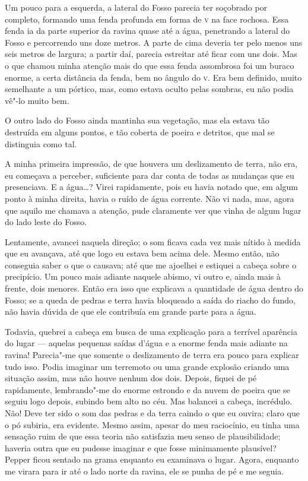 Um pouco para a esquerda, a lateral do Fosso parecia ter soçobrado por completo, formando uma fenda profunda em forma
de \textsc{v} na face rochosa. Essa fenda ia da parte superior da ravina quase até a água, penetrando a lateral do Fosso e
percorrendo uns doze metros. A parte de cima deveria ter pelo menos uns seis metros de largura; a partir daí, parecia
estreitar até ficar com uns dois. Mas o que chamou minha atenção mais do que essa fenda assombrosa foi um
buraco enorme, a certa distância da fenda, bem no ângulo do \textsc{v}. Era bem definido, muito semelhante a um pórtico, mas, como
estava oculto pelas sombras, eu não podia vê"-lo muito bem.

O outro lado do Fosso ainda mantinha sua vegetação, mas ela estava tão destruída em alguns pontos, e tão coberta de
poeira e detritos, que mal se distinguia como tal.

A minha primeira impressão, de que houvera um deslizamento de terra, não era, eu começava a perceber, suficiente para
dar conta de todas as mudanças que eu presenciava. E a água\ldots{}? Virei rapidamente, pois eu havia notado que, em algum
ponto à minha direita, havia o ruído de água corrente. Não vi nada, mas, agora que aquilo me chamava a atenção, pude
claramente ver que vinha de algum lugar do lado leste do Fosso.

Lentamente, avancei naquela direção; o som ficava cada vez mais nítido à medida que eu avançava, até que logo eu estava
bem acima dele. Mesmo então, não conseguia saber o que o causava; até que me ajoelhei e estiquei a cabeça sobre o
precipício. Um pouco mais adiante naquele abismo, vi outro e, ainda mais à frente, dois menores. Então era isso que
explicava a quantidade de água dentro do Fosso; se a queda de pedras e terra havia bloqueado a saída do riacho do
fundo, não havia dúvida de que ele contribuía em grande parte para a água.

Todavia, quebrei a cabeça em busca de uma explicação para a terrível aparência do lugar --- aquelas pequenas saídas
d'água e a enorme fenda mais adiante na ravina! Parecia"-me que somente o deslizamento de terra era pouco para explicar tudo
isso. Podia imaginar um terremoto ou uma grande explosão criando uma situação assim, mas não houve nenhum dos dois.
Depois, fiquei de pé rapidamente, lembrando"-me do enorme estrondo e da nuvem de poeira que se seguiu logo depois,
subindo bem alto no céu. Mas balancei a cabeça, incrédulo. Não! Deve ter sido o som das pedras e da terra caindo o que
eu ouvira; claro que o pó subiria, era evidente. Mesmo assim, apesar do meu raciocínio, eu tinha uma sensação ruim de
que essa teoria não satisfazia meu senso de plausibilidade; haveria outra que eu pudesse imaginar e que fosse
minimamente plausível? Pepper ficou sentado na grama enquanto eu examinava o lugar. Agora, enquanto me virara para ir
até o lado norte da ravina, ele se punha de pé e me seguia.

